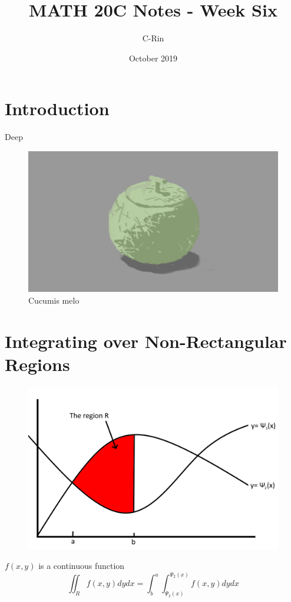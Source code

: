 \documentclass{article}
\title{MATH 20C Notes - Week Six}
\author{C-Rin}
\date{October 2019}
\begin{document}
\maketitle

\section*{Introduction}
Deep 

\begin{figure}[h!]
\centering
\includegraphics[scale=0.1]{melon.jpg}
\caption{Cucumis melo}
\end{figure}

\newpage
\section{Integrating over Non-Rectangular Regions}
\begin{figure}[h!]
    \centering
    \includegraphics[scale=.2]{rectRegion.png}
    \caption{}
    \label{}
\end{figure}
$f(x,y)$ is a continuous function
\[\iint_R f(x,y)dydx =\int^a_b \int^{\Psi_2 (x)}_{\Psi_2 (x)}f(x,y)dydx\]
\end{document}
